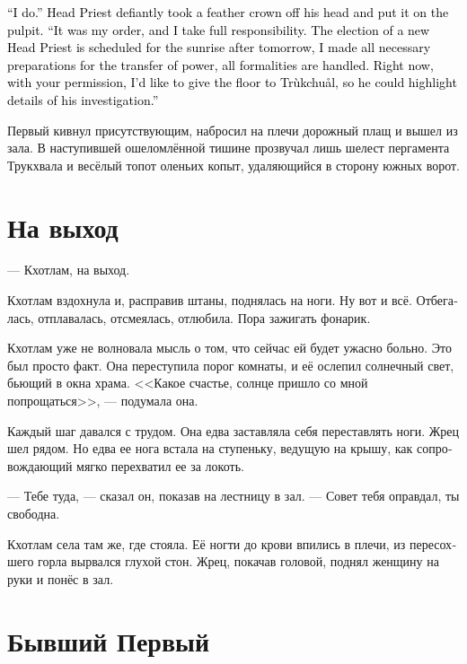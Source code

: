 \documentclass[a4paper,12pt,fleqn]{book}\usepackage{cooltooltips}\usepackage{polyglossia}\setdefaultlanguage[babelshorthands=true]{russian}\setotherlanguage{english}\defaultfontfeatures{Ligatures=TeX,Mapping=tex-text} \usepackage{xcolor}\definecolor{lightgray}{HTML}{bbbbbb}\color{lightgray}\newcommand{\ml}[3]{\textenglish{\textcolor{black}{#3}} }
\newcommand{\Trukchual}{Tr\`{u}kchu\r{a}l}
\begin{document}
\ml{$0$}
{--- Признаю, --- Первый демонстративно снял перьевую корону и положил на кафедру.}
{``I do.'' Head Priest defiantly took a feather crown off his head and put it on the pulpit.}
\ml{$0$}
{--- Это был мой приказ, и ответственность лежит на мне.}
{``It was my order, and I take full responsibility.}
\ml{$0$}
{Выборы нового Первого жреца уже назначены на послезавтра, все необходимые для передачи полномочий приготовления мной сделаны и формальности соблюдены.}
{The election of a new Head Priest is scheduled for the sunrise after tomorrow, I made all necessary preparations for the transfer of power, all formalities are handled.}
\ml{$0$}
{Сейчас же, с вашего позволения, я хочу дать слово Трукхвалу, чтобы он осветил подробности своего расследования.}
{Right now, with your permission, I'd like to give the floor to \Trukchual, so he could highlight details of his investigation.''}

Первый кивнул присутствующим, набросил на плечи дорожный плащ и вышел из зала.
В наступившей ошеломлённой тишине прозвучал лишь шелест пергамента Трукхвала и весёлый топот оленьих копыт, удаляющийся в сторону южных ворот.

\section{На выход}

--- Кхотлам, на выход.

Кхотлам вздохнула и, расправив штаны, поднялась на ноги.
Ну вот и всё.
Отбегалась, отплавалась, отсмеялась, отлюбила.
Пора зажигать фонарик.

Кхотлам уже не волновала мысль о том, что сейчас ей будет ужасно больно.
Это был просто факт.
Она переступила порог комнаты, и её ослепил солнечный свет, бьющий в окна храма.
<<Какое счастье, солнце пришло со мной попрощаться>>, --- подумала она.

Каждый шаг давался с трудом.
Она едва заставляла себя переставлять ноги.
Жрец шел рядом.
Но едва ее нога встала на ступеньку, ведущую на крышу, как сопровождающий мягко перехватил ее за локоть.

--- Тебе туда, --- сказал он, показав на лестницу в зал.
--- Совет тебя оправдал, ты свободна.

Кхотлам села там же, где стояла.
Её ногти до крови впились в плечи, из пересохшего горла вырвался глухой стон.
Жрец, покачав головой, поднял женщину на руки и понёс в зал.

\section{Бывший Первый}
\end{document}

